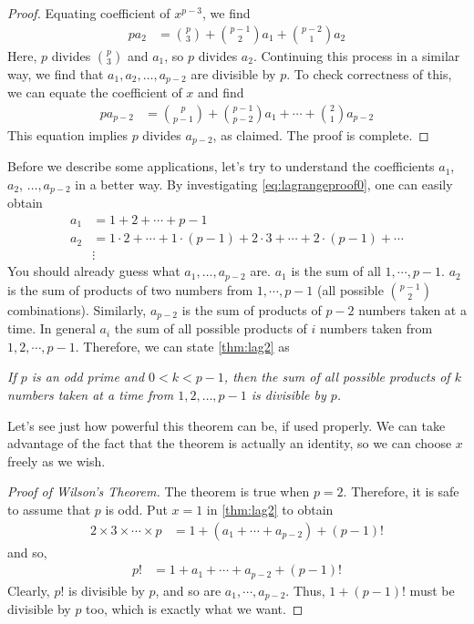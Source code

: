 \documentclass[12pt]{subfile}
\begin{document}
\begin{proof}[Proof]
			Equating coefficient of $x^{p-3}$, we find
				\begin{align*}
					pa_2
						& = \binom{p}{3}+\binom{p-1}{2}a_1+\binom{p-2}{1}a_2
				\end{align*}
			Here, $p$ divides $\binom{p}{3}$ and $a_1$, so $p$ divides $a_2$. Continuing this process in a similar way, we find that $a_1, a_2, \ldots, a_{p-2}$ are divisible by $p$. To check correctness of this, we can equate the coefficient of $x$ and find
				\begin{align*}
					pa_{p-2}
						& = \binom{p}{p-1}+\binom{p-1}{p-2}a_1+\cdots+\binom{2}{1}a_{p-2}
				\end{align*}
			This equation implies $p$ divides $a_{p-2}$, as claimed. The proof is complete.
		\end{proof}
	Before we describe some applications, let's try to understand the coefficients $a_1$, $a_2$, $\ldots,a_{p-2}$ in a better way. By investigating \eqref{eq:lagrangeproof0}, one can easily obtain
		\begin{align*}
			a_1 & = 1+2+\cdots+p-1\\
			a_2 & = 1\cdot2+\cdots+1\cdot(p-1)+2\cdot3+\cdots+2\cdot(p-1)+\cdots\\
				&  \vdots
		\end{align*}
	You should already guess what $a_1,\ldots,a_{p-2}$ are. $a_1$ is the sum of all $1,\cdots,p-1$. $a_2$ is the sum of products of two numbers from $1,\cdots,p-1$ (all possible $\binom{p-1}{2}$ combinations). Similarly, $a_{p-2}$ is the sum of products of $p-2$ numbers taken at a time. In general $a_i$ the sum of all possible products of $i$ numbers taken from $1,2,\cdots,p-1$. Therefore, we can state \autoref{thm:lag2} as
		\begin{theorem}\slshape
			If $p$ is an odd prime and $0<k<p-1$, then the sum of all possible products of $k$ numbers taken at a time from $1,2,\ldots,p-1$ is divisible by $p$.
		\end{theorem}
	Let's see just how powerful this theorem can be, if used properly. We can take advantage of the fact that the theorem is actually an identity, so we can choose $x$ freely as we wish.
		\begin{proof}[Proof of Wilson's Theorem]
			The theorem is true when $p=2$. Therefore, it is safe to assume that $p$ is odd. Put $x=1$ in \autoref{thm:lag2} to obtain
				\begin{align*}
					2\times 3 \times \cdots \times p & = 1+(a_1+\cdots+a_{p-2})+(p-1)!
				\end{align*}
			and so,
				\begin{align*}
					p! & = 1+a_1+\cdots+a_{p-2}+(p-1)!
				\end{align*}
			Clearly, $p!$ is divisible by $p$, and so are $a_1,\cdots,a_{p-2}$. Thus, $1+(p-1)!$ must be divisible by $p$ too, which is exactly what we want.
		\end{proof}
\end{document}
